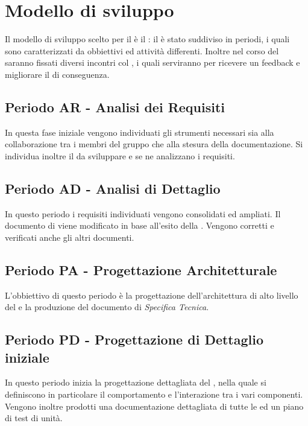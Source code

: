 \documentclass[./PianoDiProgetto.tex]{subfiles}
\begin{document}
  \section{Modello di sviluppo}

  Il modello di sviluppo scelto per il  è il : il
   è stato suddiviso in periodi, i quali sono caratterizzati da
  obbiettivi ed attività differenti. Inoltre nel corso del  saranno
  fissati diversi incontri col , i quali serviranno per ricevere un
  feedback e migliorare il  di conseguenza.

  \subsection{Periodo AR - Analisi dei Requisiti}

  In questa fase iniziale vengono individuati gli strumenti necessari sia alla
  collaborazione tra i membri del gruppo che alla stesura della documentazione.
  Si individua inoltre il  da sviluppare e se ne analizzano i requisiti.

  \subsection{Periodo AD - Analisi di Dettaglio}

  In questo periodo i requisiti individuati vengono consolidati ed ampliati. Il
  documento di \ARdoc viene modificato in base all'esito
  della \RR. Vengono corretti e verificati anche gli altri documenti.

  \subsection{Periodo PA - Progettazione Architetturale}

  L'obbiettivo di questo periodo è la progettazione dell'architettura di alto
  livello del  e la produzione del documento di \textit{Specifica Tecnica}.

  \subsection{Periodo PD - Progettazione di Dettaglio iniziale}

  In questo periodo inizia la progettazione dettagliata del , nella quale si definiscono
  in particolare il comportamento e l'interazione tra i vari componenti. Vengono
  inoltre prodotti una documentazione dettagliata di tutte le  ed un piano
  di test di unità.
\end{document}
